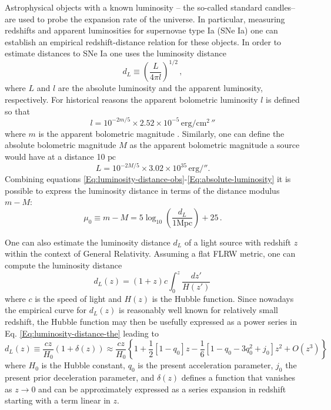 Astrophysical objects with a known luminosity -- the so-called standard candles-- are used to probe the expansion rate of the universe. In particular, measuring redshifts and apparent luminosities for supernovae type Ia (SNe Ia) one can establish an empirical redshift-distance relation for these objects. In order to estimate distances to SNe Ia one uses the luminosity distance
\begin{equation}
d_L \equiv \left(\frac{L}{4\pi l} \right)^{1/2} \, , \label{Eq:luminosity-distance-obs}
\end{equation}
where $L$ and $l$ are the absolute luminosity and the apparent luminosity, respectively. For historical reasons the apparent bolometric luminosity $l$ is defined so that 
\begin{equation}\label{Eq:apparent-luminosity}
l = 10^{-2m/5}\times 2.52 \times 10^{-5}\, \mathrm{erg/ cm^2}\, \second
\end{equation}
where $m$ is the apparent bolometric magnitude \cite{Weinberg:1972kfs}. Similarly, one can define the absolute bolometric magnitude $M$ as the apparent bolometric magnitude a source would have at a distance 10 $\mathrm{pc}$
\begin{equation}\label{Eq:absolute-luminosity}
L = 10^{-2M/5} \times 3.02 \times 10^{35}\, \mathrm{erg/}\second.
\end{equation}
Combining equations \eqref{Eq:luminosity-distance-obs}-\eqref{Eq:absolute-luminosity} it is possible to express the luminosity distance in terms of the distance modulus $m-M$:
\begin{equation}
\mu_0 \equiv m - M = 5 \log_{10} \left(\frac{d_L}{1 \mathrm{Mpc}} \right) + 25 \, . \label{Eq:distance-modulus}
\end{equation}

One can also estimate the luminosity distance $d_L$ of a light source with redshift $z$ within the context of General Relativity. Assuming a flat FLRW metric, one can compute the luminosity distance  
\begin{equation}\label{Eq:luminosity-distance-the}
d_L(z) = (1+z) c \int_0^z \frac{dz'}{H(z')} \, 
\end{equation}
where $c$ is the speed of light and $H(z)$ is the Hubble function. Since nowadays the empirical curve for $d_L(z)$ is reasonably well known for relatively small redshift, the Hubble function may then be usefully expressed as a power series in Eq. \eqref{Eq:luminosity-distance-the} leading to
\begin{equation}\label{Eq:luminosity-distance-the-small-z}
d_L(z) \equiv \frac{cz}{H_0}  ( 1+\delta(z)) \approx \frac{cz}{H_0} \left\{ 1 + \frac{1}{2} [1-q_0] z - \frac{1}{6} [1-q_0 - 3 q_0^2 + j_0] z^2 + O(z^3) \right\}
\end{equation} 
where $H_0$ is the Hubble constant, $q_0$ is the present acceleration parameter, $j_0$ the present prior deceleration parameter, and $\delta(z)$ defines a function that vanishes as $z\rightarrow 0$ and can be approximately expressed as a series expansion in redshift starting with a term linear in $z$.

